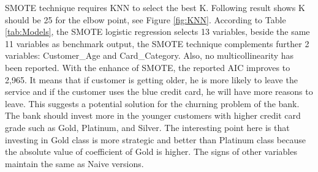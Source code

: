 SMOTE technique requires KNN to select the best K. Following result
shows K should be 25 for the elbow point, see Figure \ref{fig:KNN}.
According to Table \ref{tab:Models}, the SMOTE logistic regression
selects 13 variables, beside the same 11 variables as benchmark output,
the SMOTE technique complements further 2 variables: Customer\_Age and
Card\_Category. Also, no multicollinearity has been reported. With the
enhance of SMOTE, the reported AIC improves to 2,965. It means that if
customer is getting older, he is more likely to leave the service and if
the customer uses the blue credit card, he will have more reasons to
leave. This suggests a potential solution for the churning problem of
the bank. The bank should invest more in the younger customers with
higher credit card grade such as Gold, Platinum, and Silver. The
interesting point here is that investing in Gold class is more strategic
and better than Platinum class because the absolute value of coefficient
of Gold is higher. The signs of other variables maintain the same as
Naive versions.

